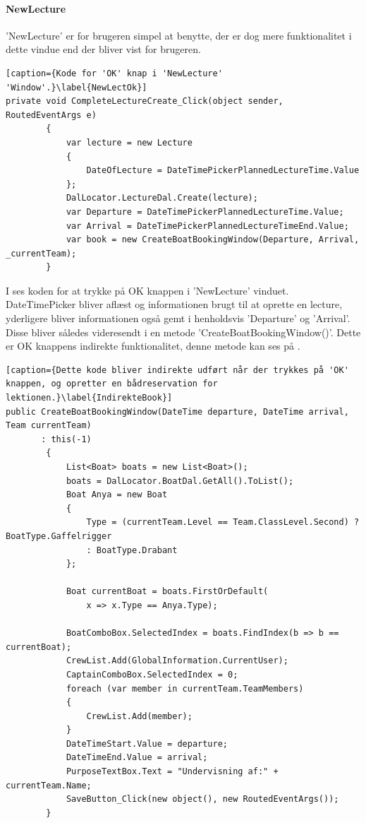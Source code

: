 \paragraph{NewLecture}
'NewLecture' er for brugeren simpel at benytte, der er dog mere funktionalitet i dette vindue end der bliver vist for brugeren.

\begin{lstlisting}[caption={Kode for 'OK' knap i 'NewLecture' 'Window'.}\label{NewLectOk}]
private void CompleteLectureCreate_Click(object sender, RoutedEventArgs e)
        {
            var lecture = new Lecture
            {
                DateOfLecture = DateTimePickerPlannedLectureTime.Value
            };
            DalLocator.LectureDal.Create(lecture);
            var Departure = DateTimePickerPlannedLectureTime.Value;
            var Arrival = DateTimePickerPlannedLectureTimeEnd.Value;
            var book = new CreateBoatBookingWindow(Departure, Arrival, _currentTeam);
        }
\end{lstlisting}
I  ses koden for at trykke på OK knappen i 'NewLecture' vinduet. DateTimePicker bliver aflæst og informationen brugt til at oprette en lecture, yderligere bliver informationen også gemt i henholdsvis 'Departure' og 'Arrival'. Disse bliver således videresendt i en metode 'CreateBoatBookingWindow()'. Dette er OK knappens indirekte funktionalitet, denne metode kan ses på .

\begin{lstlisting}[caption={Dette kode bliver indirekte udført når der trykkes på 'OK' knappen, og opretter en bådreservation for lektionen.}\label{IndirekteBook}]
public CreateBoatBookingWindow(DateTime departure, DateTime arrival, Team currentTeam) 
	   : this(-1)
        {
            List<Boat> boats = new List<Boat>();
            boats = DalLocator.BoatDal.GetAll().ToList();
            Boat Anya = new Boat
            {
                Type = (currentTeam.Level == Team.ClassLevel.Second) ? BoatType.Gaffelrigger 
                : BoatType.Drabant
            };

            Boat currentBoat = boats.FirstOrDefault(
                x => x.Type == Anya.Type);

            BoatComboBox.SelectedIndex = boats.FindIndex(b => b == currentBoat);
            CrewList.Add(GlobalInformation.CurrentUser);
            CaptainComboBox.SelectedIndex = 0;
            foreach (var member in currentTeam.TeamMembers)
            {
                CrewList.Add(member);
            }
            DateTimeStart.Value = departure;
            DateTimeEnd.Value = arrival;
            PurposeTextBox.Text = "Undervisning af:" + currentTeam.Name;
            SaveButton_Click(new object(), new RoutedEventArgs());
        }
\end{lstlisting}
